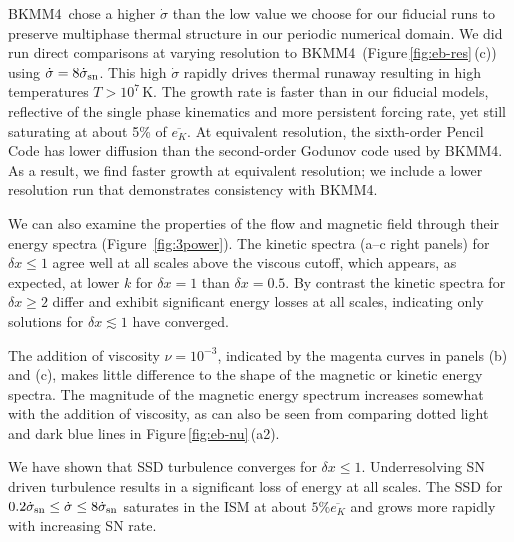 \documentclass[preprint2]{aastex63}
\newcommand\SNr{\dot\sigma_{\rm sn}}
\newcommand\dx{ {\delta x}}
\newcommand\BKM{{\sf BKMM4}}
\newcommand{\fg}[1]{\textcolor{midgreen}{#1}}
\begin{document}
 \fg{\BKM\ chose a higher $\dot\sigma$ than the low value we choose for our
 fiducial runs} \fg{to preserve multiphase \fg{thermal} structure in \fg{our}
 \fg{periodic} numerical domain.
 \fg{We did run direct comparisons at varying resolution to \BKM\
 (Figure\,\ref{fig:eb-res}\,(c))} using $\dot\sigma=8\SNr$.
 \fg{This high $\dot\sigma$ rapidly drives thermal runaway resulting in high
 temperatures $T>10^7$\,K.}
 The growth rate is faster \fg{than in our fiducial models}, reflective of the
 single phase kinematics and more persistent forcing rate, yet \fg{still}
 saturating at about 5\% of $\overline{e_K}$.
 \fg{At equivalent resolution, the sixth-order Pencil Code has lower diffusion
 than the second-order Godunov code used by \BKM. As a result, we find faster
 growth at equivalent resolution; we} include a lower resolution run \fg{that}
 demonstrate\fg{s} consistency with \BKM.} 

 \fg{We can also examine the properties of the flow and magnetic field through
 their energy spectra (Figure~\ref{fig:3power}).
 The kinetic spectra (a--c right panels) for $\dx\leq1$ agree well at 
 all scales above the viscous cutoff, which appears, as expected, at lower $k$ for
 $\dx=1$ than $\dx=0.5$.
 By contrast the kinetic spectra for $\dx\geq2$ differ and exhibit significant
 energy losses at all scales,    
 indicating only solutions for $\dx\lesssim1$ have converged.}

 \fg{The addition of viscosity $\nu=10^{-3}$, indicated by the magenta curves in
 panels (b) and (c), \fg{makes little difference to the shape of the
   magnetic or kinetic energy spectra.  The magnitude of the magnetic
   energy spectrum increases somewhat with the addition of viscosity,
   as can also be seen from comparing dotted light and dark blue
   lines in Figure\,\ref{fig:eb-nu}\,(a2).}
   }

 \fg{We have shown that SSD turbulence \fg{converges} for $\dx\leq1$.
 Underresolving SN driven turbulence results in a significant loss of energy
 at all scales. \fg{The}
 SSD for $0.2\SNr\leq \dot\sigma \leq 8\SNr$ saturates in the ISM at about
 $5\%\overline{e_K}$ and grows more rapidly with increasing SN rate.
 } 
\end{document}
